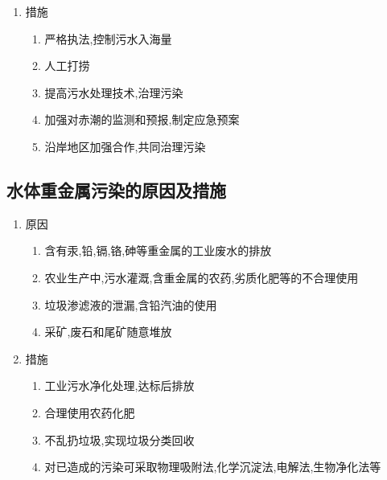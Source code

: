 \documentclass[a4paper]{article}
\begin{document}
\begin{enumerate}
\begin{enumerate}
\begin{enumerate}
            \end{enumerate}
            \item 措施
            \begin{enumerate}
                \item 严格执法,控制污水入海量
                \item 人工打捞
                \item 提高污水处理技术,治理污染
                \item 加强对赤潮的监测和预报,制定应急预案
                \item 沿岸地区加强合作,共同治理污染
            \end{enumerate}
        \end{enumerate}
    \end{enumerate}
    \subsection{水体重金属污染的原因及措施}
    \begin{enumerate}
        \item 原因
        \begin{enumerate}
            \item 含有汞,铅,镉,铬,砷等重金属的工业废水的排放
            \item 农业生产中,污水灌溉,含重金属的农药,劣质化肥等的不合理使用
            \item 垃圾渗滤液的泄漏,含铅汽油的使用
            \item 采矿,废石和尾矿随意堆放
        \end{enumerate}
        \item 措施
        \begin{enumerate}
            \item 工业污水净化处理,达标后排放
            \item 合理使用农药化肥
            \item 不乱扔垃圾,实现垃圾分类回收
            \item 对已造成的污染可采取物理吸附法,化学沉淀法,电解法,生物净化法等
        \end{enumerate}
    \end{enumerate}
\end{document}
